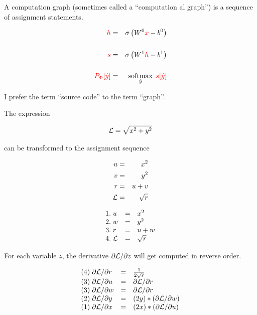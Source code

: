 {

A computation graph (sometimes called a ``computation{\color{red} al} graph'') is a sequence of assignment statements.


\begin{eqnarray*}
  {\color{red} h} & = & \sigma\left(W^0{\color{red} x} - b^0\right) \\
  \\
  {\color{red} s} & = & \sigma\left(W^1{\color{red} h} - b^1 \right) \\
  \\
  {\color{red} P_\Phi[\hat{y}]} & = & \operatorname*{softmax}_{\hat{y}}\;{\color{red} s[\hat{y}]}
\end{eqnarray*}

\vfill
I prefer the term ``source code'' to the term ``graph''.


The expression

\vfill
{\color{red} $${\cal L} = \sqrt{x^2 + y^2}$$}

\vfill
can be transformed to the assignment sequence

{\color{red}
\vfill
\begin{eqnarray*}
  u & = & x^2  \\
  v & = & y^2 \\
  r & =& u + v \\
  {\cal L} & = & \sqrt{r}
\end{eqnarray*}
}

\vspace{-1ex}
{\color{red}
$$\begin{array}{lcl}
 1.\;u & = & x^2  \\
 2.\;w & = & y^2 \\
 3.\;r & =& u + w \\
  4.\;{\cal L} & = & \sqrt{r}
\end{array}$$
}

\vfill
For each variable $z$, the derivative $\partial {\cal L}/\partial z$ will get computed in reverse order.

\vfill
{\color{red}
$$\begin{array}{lcl}
(4)\; \partial{\cal L}/\partial r & = & \frac{1}{2\sqrt{r}} \\
(3)\; \partial{\cal L}/\partial u & = & \partial {\cal L}/\partial r \\
(3)\; \partial{\cal L}/\partial w & = & \partial {\cal L}/\partial r\\
(2)\; \partial{\cal L}/\partial y & = &  (2y) * (\partial {\cal L}/\partial w) \\
(1)\; \partial{\cal L}/\partial x & = & (2x) * (\partial {\cal L}/\partial u)
\end{array}$$
}

}
